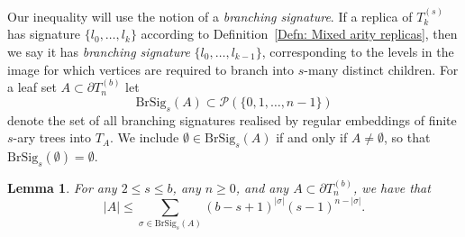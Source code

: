 \documentclass[11pt]{amsart}
\newcommand\labs[1]{\left\lvert#1\right\rvert}
\renewcommand{\leq}{\leqslant}
\renewcommand{\geq}{\geqslant}
\theoremstyle{plain}
\newtheorem{lem}[thm]{Lemma}
\theoremstyle{definition}
\theoremstyle{remark}
\begin{document}
Our inequality will use the notion of a \textit{branching signature}. If a replica of $T_k^{(s)}$ has signature $\{l_0,\ldots,l_k\}$ according to Definition~\ref{Defn: Mixed arity replicas}, then we say it has \textit{branching signature} $\{l_0,\ldots,l_{k-1}\}$, corresponding to the levels in the image for which vertices are required to branch into $s$-many distinct children. For a leaf set $A\subset \partial T_n^{(b)}$ let
\[ \mathrm{BrSig}_s(A) \subset \mathcal{P}(\{0,1,\ldots,n-1\})\]
denote the set of all branching signatures realised by regular embeddings of finite $s$-ary trees into $T_A$. We include $\emptyset \in\mathrm{BrSig}_s(A)$ if and only if $A\neq \emptyset$, so that $\mathrm{BrSig}_s(\emptyset)= \emptyset$.
\begin{lem}\label{Lemma: Sig counting lemma}
For any $2\leq s\leq b$, any $n\geq 0$, and any $A\subset \partial T_n^{(b)}$, we have that
\begin{equation}\label{eq: branching sig inequ}
\labs{A} \leq \sum_{\sigma \in \mathrm{BrSig}_s(A)} (b-s+1)^{\labs{\sigma}} (s-1)^{n-\labs{\sigma}}.
\end{equation}
\end{lem}
\end{document}
